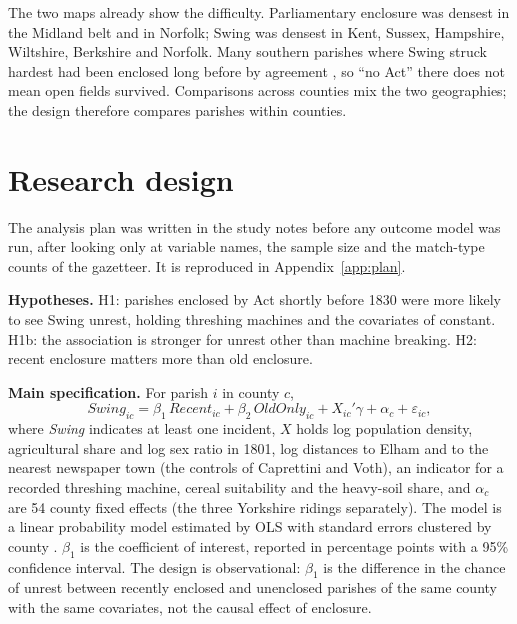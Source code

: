 \documentclass[11pt,a4paper]{article}
\begin{document}
The two maps already show the difficulty. Parliamentary enclosure was densest in the Midland belt and in Norfolk; Swing was densest in Kent, Sussex, Hampshire, Wiltshire, Berkshire and Norfolk. Many southern parishes where Swing struck hardest had been enclosed long before by agreement \citep{wordie1983}, so ``no Act'' there does not mean open fields survived. Comparisons across counties mix the two geographies; the design therefore compares parishes within counties.

\section{Research design}
The analysis plan was written in the study notes before any outcome model was run, after looking only at variable names, the sample size and the match-type counts of the gazetteer. It is reproduced in Appendix~\ref{app:plan}.

\textbf{Hypotheses.} H1: parishes enclosed by Act shortly before 1830 were more likely to see Swing unrest, holding threshing machines and the covariates of \citet{caprettinivoth2020} constant. H1b: the association is stronger for unrest other than machine breaking. H2: recent enclosure matters more than old enclosure.

\textbf{Main specification.} For parish $i$ in county $c$,
\[ \textit{Swing}_{ic} = \beta_1\,\textit{Recent}_{ic} + \beta_2\,\textit{OldOnly}_{ic} + X_{ic}'\gamma + \alpha_c + \varepsilon_{ic}, \]
where \textit{Swing} indicates at least one incident, $X$ holds log population density, agricultural share and log sex ratio in 1801, log distances to Elham and to the nearest newspaper town (the controls of Caprettini and Voth), an indicator for a recorded threshing machine, cereal suitability and the heavy-soil share, and $\alpha_c$ are 54 county fixed effects (the three Yorkshire ridings separately). The model is a linear probability model estimated by OLS with standard errors clustered by county \citep{cameronmiller2015,abadie2023}. $\beta_1$ is the coefficient of interest, reported in percentage points with a 95\% confidence interval. The design is observational: $\beta_1$ is the difference in the chance of unrest between recently enclosed and unenclosed parishes of the same county with the same covariates, not the causal effect of enclosure.
\end{document}
